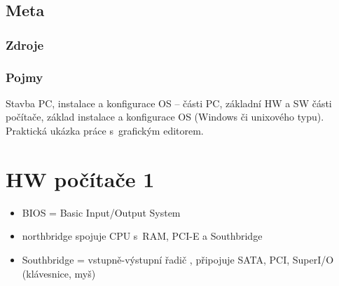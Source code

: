 \documentclass[12pt]{article}
\begin{document}
\subsection{Meta}
\subsubsection{Zdroje}
\subsubsection{Pojmy}
Stavba PC, instalace a konfigurace OS – části PC, základní HW a SW části počítače, základ instalace a konfigurace OS (Windows či unixového typu). Praktická ukázka práce s~grafickým editorem.

\section{HW počítače 1}
\begin{itemize}
\item BIOS = Basic Input/Output System
\item northbridge spojuje CPU s~RAM, PCI-E a Southbridge
\item Southbridge = vstupně-výstupní řadič , připojuje SATA, PCI, SuperI/O (klávesnice, myš)
\end{itemize}
\end{document}
